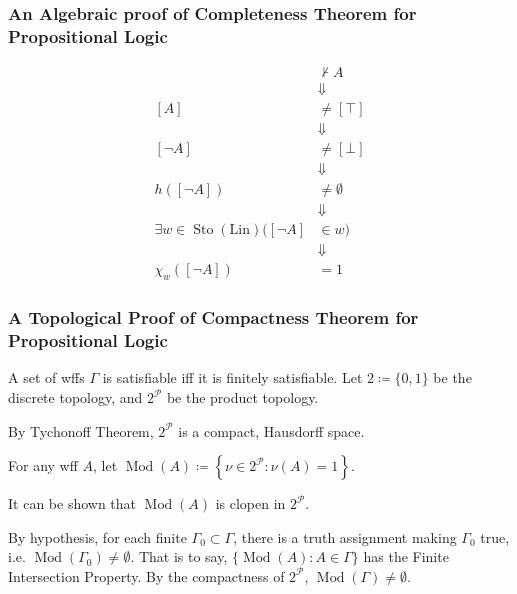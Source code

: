\documentclass[UTF8,aspectratio=43,11pt,colorlinks,compress,openany]{beamer}%
\begin{document}
\begin{frame}\frametitle{\small An Algebraic proof of Completeness Theorem for Propositional Logic}
\setlength\abovedisplayskip{0pt}
\setlength\belowdisplayskip{0pt}
\begin{align*}
				&\nvdash A\\
				&\Downarrow\\
				[A]&\neq[\top]\\
				&\Downarrow\\
				[\neg A]&\neq[\bot]\\
				&\Downarrow\\
				h\left([\neg A]\right)&\neq\emptyset\\
				&\Downarrow\\
				\exists w\in\operatorname{Sto}(\mathrm{Lin})\big([\neg A]&\in w\big)\\
				&\Downarrow\\
				\chi_w\left([\neg A]\right)&=1
\end{align*}
\end{frame}

\begin{frame}\frametitle{\small A Topological Proof of Compactness Theorem for Propositional Logic}
\begin{block}{A set of wffs $\Gamma$ is satisfiable iff it is finitely satisfiable.}
Let $2\coloneqq \{0,1\}$ be the discrete topology, and $2^{\mathcal{P}}$ be the product topology.

By Tychonoff Theorem, $2^{\mathcal{P}}$ is a compact, Hausdorff space.

For any wff $A$, let $\operatorname{Mod}(A)\coloneqq \left\{\nu\in 2^{\mathcal{P}}: \nu(A)=1\right\}$.

It can be shown that $\operatorname{Mod}(A)$ is clopen in $2^{\mathcal{P}}$.

By hypothesis, for each finite $\Gamma_0\subset\Gamma$, there is a truth assignment making $\Gamma_0$ true, i.e. $\operatorname{Mod}(\Gamma_0)\neq\emptyset$. That is to say, $\{\operatorname{Mod}(A): A\in\Gamma\}$ has the Finite Intersection Property. By the compactness of $2^{\mathcal{P}}$, $\operatorname{Mod}(\Gamma)\neq\emptyset$.
\end{block}
\end{frame}
\end{document}
